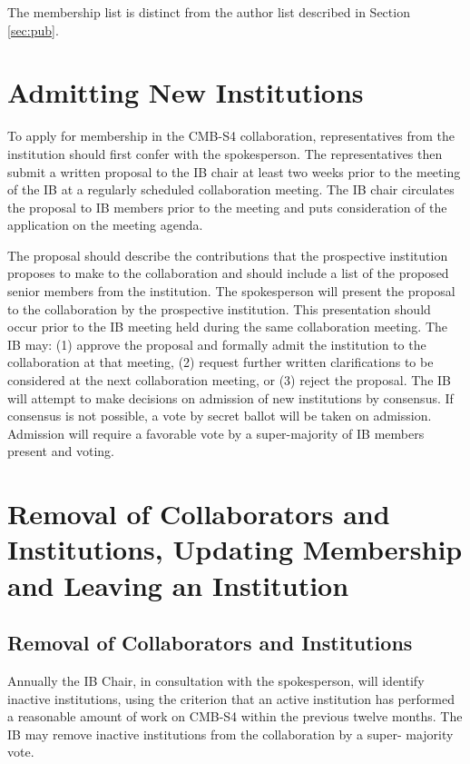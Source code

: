 The membership list is distinct from the author list described in Section \ref{sec:pub}.

\section{Admitting New Institutions}

To apply for membership in the CMB-S4 collaboration, representatives from the institution should first confer with the spokesperson. The representatives then submit a written proposal to the IB chair at least two weeks prior to the meeting of the IB at a regularly scheduled collaboration meeting. The IB chair circulates the proposal to IB members prior to the meeting and puts consideration of the application on the meeting agenda.

The proposal should describe the contributions that the prospective institution proposes to make to the collaboration and should include a list of the proposed senior members from the institution. The spokesperson will present the proposal to the collaboration by the prospective institution. This presentation should occur prior to the IB meeting held during the same collaboration meeting. The IB may: (1) approve the proposal and formally admit the institution to the collaboration at that meeting, (2) request further written clarifications to be considered at the next collaboration meeting, or (3) reject the proposal. The IB will attempt to make decisions on admission of new institutions by consensus. If consensus is not possible, a vote by secret ballot will be taken on admission. Admission will require a favorable vote by a super-majority of IB members present and voting.

\section{Removal of Collaborators and Institutions, Updating Membership and Leaving an Institution}

\subsection{Removal of Collaborators and Institutions}

Annually the IB Chair, in consultation with the spokesperson, will identify inactive institutions, using the criterion that an active institution has performed a reasonable amount of work on CMB-S4 within the previous twelve months. The IB may remove inactive institutions from the collaboration by a super- majority vote.


